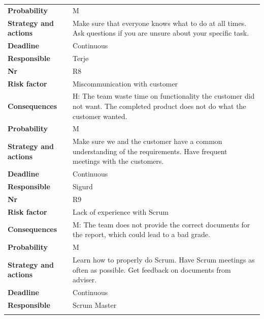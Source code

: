 \begin{longtable}{l p{9cm}}
\textbf{Probability} & M \\ 
\textbf{Strategy and actions} & Make sure that everyone knows what to do at all times. Ask questions if you are unsure about your specific task. \\
\textbf{Deadline} & Continuous \\
\textbf{Responsible} & Terje \\
\hline
\textbf{Nr} & R8 \\
\textbf{Risk factor} & Miscommunication with customer \\
\textbf{Consequences} & H: The team waste time on functionality the customer did not want. The completed product does not do what the customer wanted. \\
\textbf{Probability} & M \\ 
\textbf{Strategy and actions} & Make sure we and the customer have a common understanding of the requirements.
Have frequent meetings with the customers.  \\
\textbf{Deadline} & Continuous \\
\textbf{Responsible} & Sigurd \\
\hline
\textbf{Nr} & R9 \\
\textbf{Risk factor} & Lack of experience with Scrum \\
\textbf{Consequences} & M: The team does not provide the correct documents for the report, which could lead to a bad grade. \\
\textbf{Probability} & M \\ 
\textbf{Strategy and actions} & Learn how to properly do Scrum. Have Scrum meetings as often as possible. Get feedback on documents from adviser. \\
\textbf{Deadline} & Continuous \\
\textbf{Responsible} & Scrum Master \\
\hline
\label{tab:Risk}
\end{longtable}


